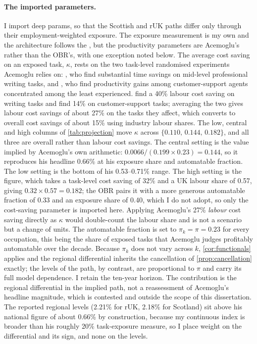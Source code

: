 \paragraph{The imported parameters.} I import deep params, so that the Scottish and rUK paths differ only through their employment-weighted exposure. The exposure measurement is my own and the architecture follows the \citet{obr2025}, but the productivity parameters are Acemoglu's rather than the OBR's, with one exception noted below. The average cost saving on an exposed task, $\kappa$, rests on the two task-level randomised experiments Acemoglu relies on: \citet{noy2023}, who find substantial time savings on mid-level professional writing tasks, and \citet{brynjolfsson2025}, who find productivity gains among customer-support agents concentrated among the least experienced. \citet{noy2023} find a 40\% labour cost saving on writing tasks and \citet{brynjolfsson2025} find 14\% on customer-support tasks; averaging the two gives labour cost savings of about 27\% on the tasks they affect, which \citet{acemoglu2025} converts to overall cost savings of about 15\% using industry labour shares. The low, central and high columns of \cref{tab:projection} move $\kappa$ across $\{0.110,\, 0.144,\, 0.182\}$, and all three are overall rather than labour cost savings. The central setting is the value implied by Acemoglu's own arithmetic: $0.0066 / (0.199 \times 0.23) = 0.144$, so it reproduces his headline 0.66\% at his exposure share and automatable fraction. The low setting is the bottom of his 0.53--0.71\% range. The high setting is the \citet{obr2025} figure, which takes a task-level cost saving of 32\% and a UK labour share of 0.57, giving $0.32 \times 0.57 = 0.182$; the OBR pairs it with a more generous automatable fraction of 0.33 and an exposure share of 0.40, which I do not adopt, so only the cost-saving parameter is imported here. Applying Acemoglu's 27\% \emph{labour} cost saving directly as $\kappa$ would double-count the labour share and is not a scenario but a change of units. The automatable fraction is set to $\pi_k = \pi = 0.23$ for every occupation, this being the share of exposed tasks that Acemoglu judges profitably automatable over the decade. Because $\pi_k$ does not vary across $k$, \cref{cor:functionals} applies and the regional differential inherits the cancellation of \cref{prop:cancellation} exactly; the levels of the path, by contrast, are proportional to $\pi$ and carry its full model dependence. I retain the ten-year horizon. The contribution is the regional differential in the implied path, not a reassessment of Acemoglu's headline magnitude, which is contested and outside the scope of this dissertation. The reported regional levels (2.21\% for rUK, 2.18\% for Scotland) sit above his national figure of about 0.66\% by construction, because my continuous index is broader than his roughly 20\% task-exposure measure, so I place weight on the differential and its sign, and none on the levels.

